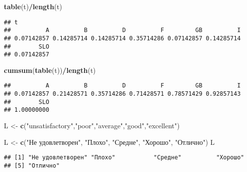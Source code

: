 \documentclass[12pt,]{article}
\newenvironment{Shaded}{\begin{snugshade}}{\end{snugshade}}
\newcommand{\KeywordTok}[1]{\textcolor[rgb]{0.13,0.29,0.53}{\textbf{#1}}}
\newcommand{\StringTok}[1]{\textcolor[rgb]{0.31,0.60,0.02}{#1}}
\newcommand{\OperatorTok}[1]{\textcolor[rgb]{0.81,0.36,0.00}{\textbf{#1}}}
\newcommand{\NormalTok}[1]{#1}
\begin{document}
\begin{Shaded}
\begin{Highlighting}[]
\KeywordTok{table}\NormalTok{(t)}\OperatorTok{/}\KeywordTok{length}\NormalTok{(t)}
\end{Highlighting}
\end{Shaded}

\begin{verbatim}
## t
##          A          B          D          F         GB          I 
## 0.07142857 0.14285714 0.14285714 0.35714286 0.07142857 0.14285714 
##        SLO 
## 0.07142857
\end{verbatim}

\begin{Shaded}
\begin{Highlighting}[]
\KeywordTok{cumsum}\NormalTok{(}\KeywordTok{table}\NormalTok{(t))}\OperatorTok{/}\KeywordTok{length}\NormalTok{(t)}
\end{Highlighting}
\end{Shaded}

\begin{verbatim}
##          A          B          D          F         GB          I 
## 0.07142857 0.21428571 0.35714286 0.71428571 0.78571429 0.92857143 
##        SLO 
## 1.00000000
\end{verbatim}

\begin{Shaded}
\begin{Highlighting}[]
\NormalTok{L <-}\StringTok{ }\KeywordTok{c}\NormalTok{(}\StringTok{"unsatisfactory"}\NormalTok{,}\StringTok{"poor"}\NormalTok{,}\StringTok{"average"}\NormalTok{,}\StringTok{"good"}\NormalTok{,}\StringTok{"excellent"}\NormalTok{)}

\NormalTok{L <-}\StringTok{ }\KeywordTok{c}\NormalTok{(}\StringTok{"Не удовлетворен"}\NormalTok{, }\StringTok{"Плохо"}\NormalTok{, }\StringTok{"Средне"}\NormalTok{, }\StringTok{"Хорошо"}\NormalTok{, }\StringTok{"Отлично"}\NormalTok{)}
\NormalTok{L}
\end{Highlighting}
\end{Shaded}

\begin{verbatim}
## [1] "Не удовлетворен" "Плохо"           "Средне"          "Хорошо"         
## [5] "Отлично"
\end{verbatim}
\end{document}
